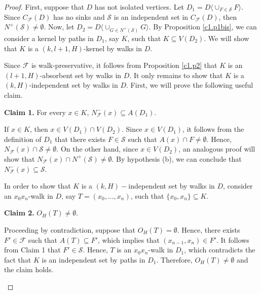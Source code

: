 \documentclass[10pt,a4paper]{article}
\begin{document}
\begin{proof} 
First, suppose that $D$ has not isolated vertices. Let $D_{1}= D\langle \cup_{F\in \mathcal{S}} F \rangle$.
Since $C_{\mathscr{F}}(D)$ has no sinks and $\mathcal{S}$ is an independent set in $C_{\mathscr{F}}(D)$, then $N^{+}(\mathcal{S}) \neq \emptyset$. Now, let $D_{2}= D\langle \cup _{G\in N^{+}(\mathcal{S})}G \rangle$.  By Proposition \ref{c1.p1bis}, we can consider a kernel by paths in $D_{1}$, say $K$, such that $K \subseteq V(D_{2})$. We will show that $K$ is a $(k,l+1,H)$-kernel by walks in $D$.

Since $\mathscr{F}$ is walk-preservative, it follows from Proposition \ref{c1.p2} that $K$ is an $(l+1,H)$-absorbent set by walks in $D$. 
It only remains to show that $K$ is a $(k, H)$-independent set by walks in $D$. First, we will prove the following useful claim.

\begin{description}
\item \textbf{Claim 1.} For every $x \in K$, $N^{-}_{\mathscr{F}}(x) \subseteq A(D_{1})$.

If $x \in K$, then $x \in V(D_{1}) \cap V(D_{2})$. Since $x \in V(D_{1})$, it follows from the definition of $D_{1}$ that there exists $F \in \mathcal{S}$ such that $A(x) \cap F \neq \emptyset$. Hence, $N_{\mathscr{F}}(x) \cap  \mathcal{S} \neq \emptyset$. On the other hand, since $x \in V(D_{2})$, an analogous proof will show that $N_{\mathscr{F}}(x) \cap N^{+}(\mathcal{S} )\neq \emptyset$. 
By hypothesis (b), we can conclude that $N^{-}_{\mathscr{F}}(x) \subseteq \mathcal{S}$.
\end{description}


In order to show that $K$ is a $(k,H)-$independent set by walks in $D$, consider an $x_{0}x_{n}$-walk in $D$, say $T=(x_{0}, \ldots , x_{n})$, such that $\{ x_{0}, x_{n} \} \subseteq K$. 
 
	\begin{description}
	\item \textbf{Claim 2.} $O_{H}(T) \neq \emptyset$.
	
	 Proceeding by contradiction, suppose that $O_{H}(T)=\emptyset$. Hence, there exists $F' \in \mathscr{F}$ such that $A(T) \subseteq F'$, which implies that $(x_{n-1}, x_{n}) \in F'$. It follows from Claim 1 that $F' \in \mathcal{S}$. Hence, $T$ is an $x_{0}x_{n}$-walk in $D_{1}$, which contradicts the fact that $K$ is an independent set by paths in $D_{1}$. Therefore, $O_{H}(T)\neq \emptyset$ and the claim holds.	
	\end{description}



\end{proof}
\end{document}
